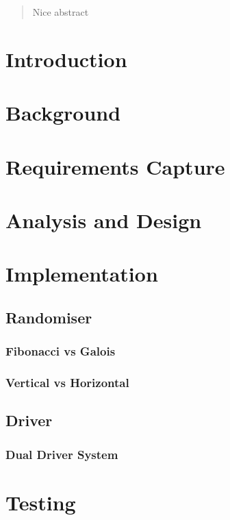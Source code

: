 \documentclass[12pt]{article}
\begin{document}


\setcounter{tocdepth}{2}
\tableofcontents

\newpage

\begin{abstract}
  Nice abstract
\end{abstract}

\section{Introduction}

\section{Background}

\section{Requirements Capture}

\section{Analysis and Design}

\section{Implementation}
\subsection{Randomiser}
\subsubsection{Fibonacci vs Galois}
\subsubsection{Vertical vs Horizontal}
\subsection{Driver}
\subsubsection{Dual Driver System}

\section{Testing}
\end{document}
